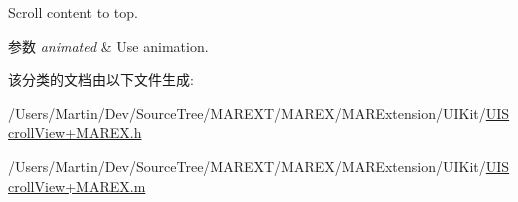 Scroll content to top.


\begin{DoxyParams}{参数}
{\em animated} & Use animation. \\
\hline
\end{DoxyParams}


该分类的文档由以下文件生成\+:\begin{DoxyCompactItemize}
\item 
/\+Users/\+Martin/\+Dev/\+Source\+Tree/\+M\+A\+R\+E\+X\+T/\+M\+A\+R\+E\+X/\+M\+A\+R\+Extension/\+U\+I\+Kit/\hyperlink{_u_i_scroll_view_09_m_a_r_e_x_8h}{U\+I\+Scroll\+View+\+M\+A\+R\+E\+X.\+h}\item 
/\+Users/\+Martin/\+Dev/\+Source\+Tree/\+M\+A\+R\+E\+X\+T/\+M\+A\+R\+E\+X/\+M\+A\+R\+Extension/\+U\+I\+Kit/\hyperlink{_u_i_scroll_view_09_m_a_r_e_x_8m}{U\+I\+Scroll\+View+\+M\+A\+R\+E\+X.\+m}\end{DoxyCompactItemize}
